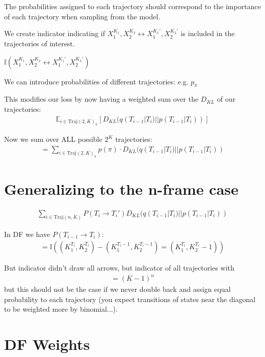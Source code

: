 \documentclass[11pt]{article}
\begin{document}
The probabilities assigned to each trajectory should correspond to the importance of each trajectory when sampling from the model.

We create indicator indicating if $X_1^{K_1}, X_2^{K_2} \leftrightarrow X_1^{K_1'}, X_2^{K_2'}$ is included in the trajectories of interest.

$\mathbb{I}(X_1^{K_1}, X_2^{K_2} \leftrightarrow X_1^{K_1'}, X_2^{K_2'})$

We can introduce probabilities of different trajectories: e.g. $p_\pi$

This modifies our loss by now having a weighted sum over the $D_{KL}$ of our trajectories:
\begin{align}
\mathbb{E}_{i \in \text{Traj}(2,K)_\pi} \left[ D_{KL}(q(T_{i-1} | T_i) || p(T_{i-1} | T_i)) \right]
\end{align}

Now we sum over ALL possible $2^K$ trajectories:
\begin{align}
= \sum_{i \in \text{Traj}(2,K)_\pi} p(\pi) \cdot D_{KL}(q(T_{i-1} | T_i) || p(T_{i-1} | T_i))
\end{align}

\section{Generalizing to the n-frame case}

\begin{align}
\sum_{i \in \text{Traj}(n,K)} P(T_i \rightarrow T_i') D_{KL}(q(T_{i-1} | T_i) || p(T_{i-1} | T_i))
\end{align}

In DF we have $P(T_{i-1} \rightarrow T_i)$:
\begin{align}
= \mathbb{I}\left( \left( K_1^{T_i}, K_2^{T_i} \right) - \left( K_1^{T_i-1}, K_2^{T_i-1} \right) = \left( K_1^{T_i}, K_2^{T_i} - 1 \right) \right)
\end{align}

But indicator didn't draw all arrows, but indicator of all trajectories with
\begin{align}
= (K-1)^n
\end{align}
but this should not be the case if we never double back and assign equal probability to each trajectory (you expect transitions of states near the diagonal to be weighted more by binomial...).

\section{DF Weights}
\end{document}
